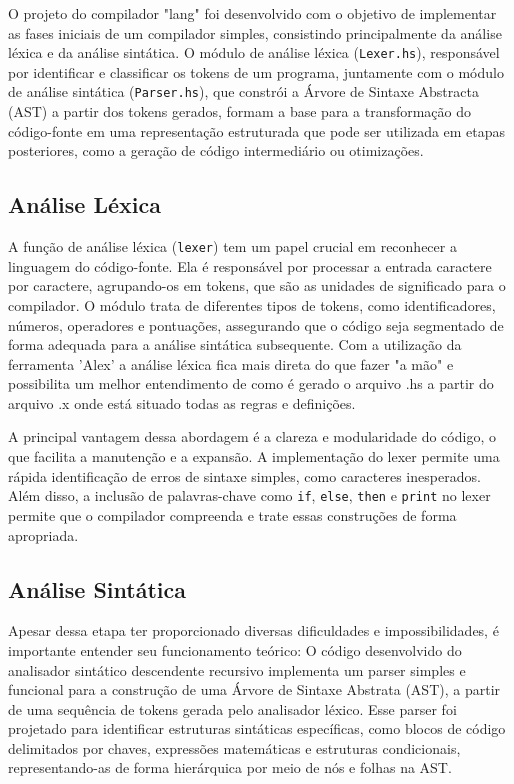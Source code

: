 \documentclass{article}
\begin{document}
O projeto do compilador "lang" foi desenvolvido com o objetivo de implementar as fases iniciais de um compilador simples, consistindo principalmente da análise léxica e da análise sintática. O módulo de análise léxica (\texttt{Lexer.hs}), responsável por identificar e classificar os tokens de um programa, juntamente com o módulo de análise sintática (\texttt{Parser.hs}), que constrói a Árvore de Sintaxe Abstracta (AST) a partir dos tokens gerados, formam a base para a transformação do código-fonte em uma representação estruturada que pode ser utilizada em etapas posteriores, como a geração de código intermediário ou otimizações.

\subsection{Análise Léxica}

A função de análise léxica (\texttt{lexer}) tem um papel crucial em reconhecer a linguagem do código-fonte. Ela é responsável por processar a entrada caractere por caractere, agrupando-os em tokens, que são as unidades de significado para o compilador. O módulo trata de diferentes tipos de tokens, como identificadores, números, operadores e pontuações, assegurando que o código seja segmentado de forma adequada para a análise sintática subsequente. Com a utilização da ferramenta 'Alex' a análise léxica fica mais direta do que fazer "a mão" e possibilita um melhor entendimento de como é gerado o arquivo .hs a partir do arquivo .x onde está situado todas as regras e definições.

A principal vantagem dessa abordagem é a clareza e modularidade do código, o que facilita a manutenção e a expansão. A implementação do lexer permite uma rápida identificação de erros de sintaxe simples, como caracteres inesperados. Além disso, a inclusão de palavras-chave como \texttt{if}, \texttt{else}, \texttt{then} e \texttt{print} no lexer permite que o compilador compreenda e trate essas construções de forma apropriada.

\subsection{Análise Sintática}

Apesar dessa etapa ter proporcionado diversas dificuldades e impossibilidades, é importante entender seu funcionamento teórico: O código desenvolvido do analisador sintático descendente recursivo implementa um parser simples e funcional para a construção de uma Árvore de Sintaxe Abstrata (AST), a partir de uma sequência de tokens gerada pelo analisador léxico. Esse parser foi projetado para identificar estruturas sintáticas específicas, como blocos de código delimitados por chaves, expressões matemáticas e estruturas condicionais, representando-as de forma hierárquica por meio de nós e folhas na AST.
\end{document}
